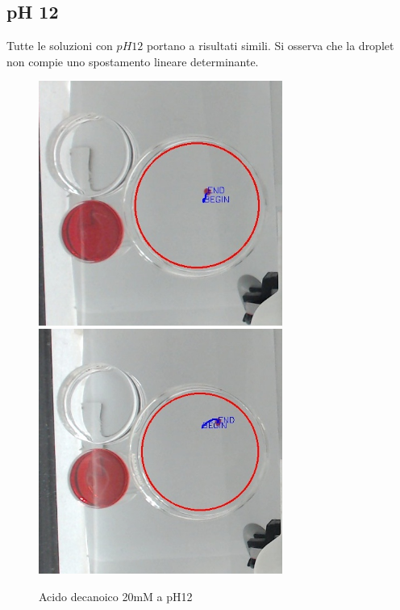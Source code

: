 \subsection{pH 12}
Tutte le soluzioni con $pH12$ portano a risultati simili. Si osserva che la droplet non compie uno spostamento lineare determinante.   
\begin{figure}[h]
	\centering
   		{\includegraphics[width=8cm]{immagini/20mMpH12-1.jpg}}
 	\hspace{2mm}   	
		{\includegraphics[width=8cm]{immagini/20mMpH12-2.jpg}}
	\caption{Acido decanoico 20mM a pH12}
\end{figure}
